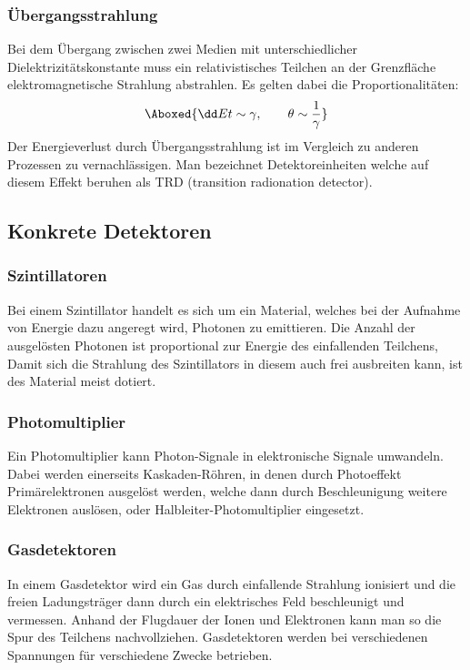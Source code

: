 \documentclass[final]{summery_5.0}
\begin{document}
\subsubsection{Übergangsstrahlung}
Bei dem Übergang zwischen zwei Medien mit unterschiedlicher Dielektrizitätskonstante muss ein
relativistisches Teilchen an der Grenzfläche elektromagnetische Strahlung abstrahlen. Es gelten dabei die Proportionalitäten:
\begin{align*}
    \Aboxed{\dd Et \sim \gamma,\qquad \theta \sim \frac1\gamma}
\end{align*}
Der Energieverlust durch Übergangsstrahlung
ist im Vergleich zu anderen Prozessen zu
vernachlässigen. Man bezeichnet Detektoreinheiten welche auf diesem Effekt beruhen  als TRD (transition radionation detector).

\subsubsection{}

\subsection{Konkrete Detektoren}
\subsubsection{Szintillatoren}
Bei einem Szintillator handelt es sich um ein Material, welches bei der Aufnahme von Energie dazu angeregt wird, Photonen zu emittieren. Die Anzahl der ausgelösten Photonen ist proportional zur Energie des einfallenden Teilchens,
Damit sich die Strahlung des Szintillators in diesem auch frei ausbreiten kann, ist des Material meist dotiert.

\subsubsection{Photomultiplier}
Ein Photomultiplier kann Photon-Signale in elektronische
Signale umwandeln. Dabei werden einerseits Kaskaden-Röhren, in denen durch
Photoeffekt Primärelektronen ausgelöst werden, welche dann durch Beschleunigung weitere Elektronen auslösen, oder Halbleiter-Photomultiplier eingesetzt. 

\subsubsection{Gasdetektoren}
In einem Gasdetektor wird ein Gas durch einfallende Strahlung ionisiert und die freien Ladungsträger dann durch ein elektrisches Feld beschleunigt und vermessen. Anhand der Flugdauer der Ionen und Elektronen kann man so die Spur des Teilchens nachvollziehen. Gasdetektoren werden bei verschiedenen Spannungen für verschiedene Zwecke betrieben.
\end{document}
